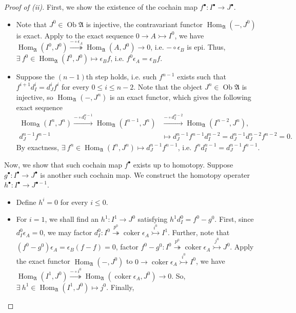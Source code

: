 \documentclass[11pt,a4paper,footinclude=true,headinclude=true]{scrbook} %
\DeclareMathOperator{\Hom}{Hom}
\DeclareMathOperator{\Coker}{coker}
\DeclareMathOperator{\Ob}{Ob}
\newcommand{\Af}{\mathfrak{A}}
\newcommand{\<}{\langle}
\newcommand{\>}{\rangle}
\begin{document}
\begin{proof}[Proof of (ii)]
    First, we show the existence of the cochain map $f^\bullet:I^\bullet\to J^\bullet$.
    \begin{itemize}
        \item Note that $J^0\in\Ob\Af$ is injective, the contravariant functor $\Hom_\Af(-,J^0)$ is exact. Apply to the exact sequence $0\to A\rightarrowtail I^0$, we have $\Hom_\Af(I^0,J^0)\overset{-\circ\epsilon_A}{\twoheadrightarrow}\Hom_\Af(A,J^0)\to0$, i.e. $-\circ\epsilon_B$ is epi. Thus, $\exists\ f^0\in\Hom_\Af(I^0,J^0)\mapsto\epsilon_Bf$, i.e. $f^0\epsilon_A=\epsilon_Bf$.
        \item Suppose the $(n-1)$th step holds, i.e. such $f^{n-1}$ exists such that $f^{i+1}d_I^i=d_J^if^i$ for every $0\leq i\leq n-2$. Note that the object $J^n\in\Ob\Af$ is injective, so $\Hom_\Af(-,J^n)$ is an exact functor, which gives the following exact sequence
        \begin{align*}
            \Hom_\Af(I^n,J^n)\xrightarrow{-\circ d_I^{n-1}} \Hom_\Af(I^{n-1},J^n) &\xrightarrow{-\circ d_I^{n-2}} \Hom_\Af(I^{n-2},J^n),\\
            d_J^{n-1}f^{n-1} &\longmapsto d_J^{n-1}f^{n-1}d_I^{n-2}=d_J^{n-1}d_J^{n-2}f^{n-2}=0.
        \end{align*}
        By exactness, $\exists\ f^n\in\Hom_\Af(I^n,J^n)\mapsto d_J^{n-1}f^{n-1}$, i.e. $f^nd_I^{n-1}= d_J^{n-1}f^{n-1}$.
    \end{itemize}
    Now, we show that such cochain map $f^\bullet$ exists up to homotopy. Suppose $g^\bullet:I^\bullet\to J^\bullet$ is another such cochain map. We construct the homotopy operater $h^\bullet:I^\bullet\to J^{\bullet-1}$.
    \begin{itemize}
        \item Define $h^i=0$ for every $i\leq0$.
        \item For $i=1$, we shall find an $h^1:I^1\to J^0$ satisfying $h^1d_I^0=f^0-g^0$. First, since $d_I^0\epsilon_A=0$, we may factor  $d_I^0:I^0\overset{p^0}{\twoheadrightarrow}\Coker\epsilon_A\overset{i^0}{\rightarrowtail}I^1$. Further, note that $(f^0-g^0)\epsilon_A=\epsilon_B(f-f)=0$, factor $f^0-g^0:I^0\overset{p^0}{\twoheadrightarrow}\Coker\epsilon_A\overset{j^0}{\rightarrowtail}J^0$. Apply the exact functor $\Hom_\Af(-,J^0)$ to $0\to\Coker\epsilon_A\overset{i^0}{\rightarrowtail}I^0$, we have $\Hom_\Af(I^1,J^0)\overset{-\circ i^0}{\twoheadrightarrow}\Hom_\Af(\Coker\epsilon_A,J^0)\to0$. So, $\exists\  h^1\in\Hom_\Af(I^1,J^0)\mapsto j^0$. Finally,

\end{itemize}
\end{proof}
\end{document}
